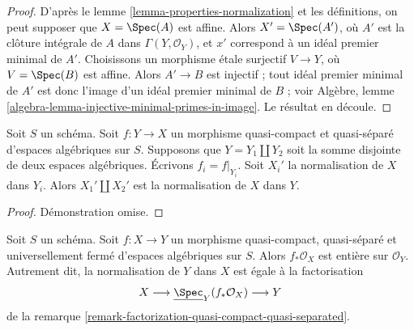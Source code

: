 \begin{proof}
D'après le lemme \ref{lemma-properties-normalization} et les définitions, on peut
supposer que $X = \Spec(A)$ est affine. Alors $X' = \Spec(A')$, où $A'$ est
la clôture intégrale de $A$ dans $\Gamma(Y, \mathcal{O}_Y)$, et $x'$ correspond
à un idéal premier minimal de $A'$. Choisissons un morphisme étale surjectif
$V \to Y$, où $V = \Spec(B)$ est affine. Alors
$A' \to B$ est injectif ; tout idéal premier minimal de $A'$ est donc
l'image d'un idéal premier minimal de $B$ ; voir
Algèbre, lemme \ref{algebra-lemma-injective-minimal-primes-in-image}.
Le résultat en découle.
\end{proof}

\begin{lemma}
\label{lemma-normalization-in-disjoint-union}
Soit $S$ un schéma.
Soit $f : Y \to X$ un morphisme quasi-compact et quasi-séparé
d'espaces algébriques sur $S$.
Supposons que $Y = Y_1 \amalg Y_2$ soit la somme disjointe de deux
espaces algébriques.
Écrivons $f_i = f|_{Y_i}$. Soit $X_i'$ la normalisation de $X$ dans $Y_i$.
Alors $X_1' \amalg X_2'$ est la normalisation de $X$ dans $Y$.
\end{lemma}

\begin{proof}
Démonstration omise.
\end{proof}

\begin{lemma}
\label{lemma-normalization-in-universally-closed}
Soit $S$ un schéma.
Soit $f : X \to Y$ un morphisme quasi-compact, quasi-séparé et
universellement fermé d'espaces algébriques sur $S$.
Alors $f_*\mathcal{O}_X$ est entière sur $\mathcal{O}_Y$. Autrement
dit, la normalisation de $Y$ dans $X$ est égale à la factorisation
$$
X \longrightarrow \underline{\Spec}_Y(f_*\mathcal{O}_X)
\longrightarrow Y
$$
de la remarque \ref{remark-factorization-quasi-compact-quasi-separated}.
\end{lemma}

